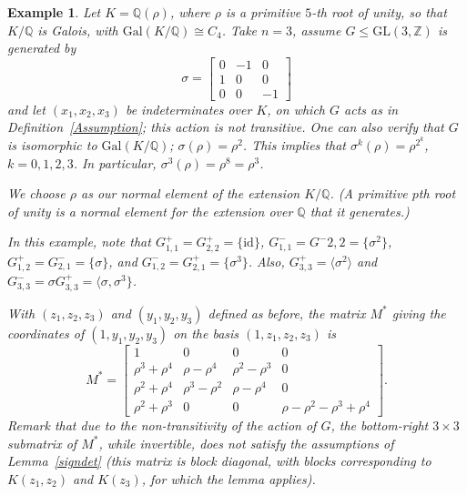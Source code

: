 \documentclass[12pt]{article}
\theoremstyle{plain}
\newtheorem{example}[theorem]{Example}
\newcommand{\Z}{\ensuremath{\mathbb{Z}}}
\newcommand{\Q}{\ensuremath{\mathbb{Q}}}
\begin{document}
\begin{example}
Let $K= \Q(\rho)$, where $\rho$ is a primitive $5$-th root of unity,
so that $K/\Q$ is Galois, with $\mathrm{Gal}(K/\Q) \cong C_4$.
Take $n=3$, assume $G\leq \mathrm{GL}(3,\Z)$ is generated by $$
\sigma = \begin{bmatrix}
0&-1&0\\
1&0&0\\
0&0&-1
\end{bmatrix}$$ and let $(x_1, x_2, x_3)$ be
indeterminates over $K$, on which $G$ acts as in Definition~\ref{Assumption};
this action is not transitive.
One can also verify that $G$ is isomorphic to $\mathrm{Gal}(K/\Q)$;
$\sigma(\rho)=\rho^2$.  This implies that $\sigma^k(\rho)=\rho^{2^k}$, $k=0,1,2,3$.
In particular, $\sigma^3(\rho)=\rho^{8}=\rho^3$.

We choose $\rho$ as our normal element of the extension $K/\Q$.
(A primitive $p$th root of unity is a normal element for the extension over $\Q$ that it generates.)

In this example, note that $G^+_{1,1}=G^+_{2,2}=\{\mathrm{id}\}$, $G^-_{1,1}=G^-{2,2}=\{\sigma^2\}$, $G^+_{1,2}=G^-_{2,1}=\{\sigma\}$, and $G^-_{1,2}=G^+_{2,1}=\{\sigma^3\}$. Also, $G^+_{3,3}=\langle\sigma^2\rangle$ and $G^-_{3,3}=\sigma G^+_{3,3}=
\langle \sigma,\sigma^3\}$.

With $(z_1,z_2,z_3)$ and $(y_1,y_2,y_3)$
defined as before, the matrix $M^*$ giving the coordinates of
$(1,y_1,y_2,y_3)$ on the basis $(1,z_1,z_2,z_3)$ is
$$M^*= \begin{bmatrix}
1 &0&0&0\\
\rho^3+\rho^4 & \rho -\rho^4 & \rho^2 -\rho^3 & 0\\
\rho^2+\rho^4 & \rho^3 -\rho^2 & \rho -\rho^4 &0 \\
\rho^2+\rho^3 &0 &0 & \rho - \rho^2 -\rho^3+\rho^4
\end{bmatrix}.
$$ Remark that due to the non-transitivity of the action of $G$, the
bottom-right $3 \times 3$ submatrix of $M^*$, while invertible, does
not satisfy the assumptions of Lemma~\ref{signdet} (this matrix is
block diagonal, with blocks corresponding to $K(z_1,z_2)$ and
$K(z_3)$, for which the lemma applies).
\end{example}




\end{document}
